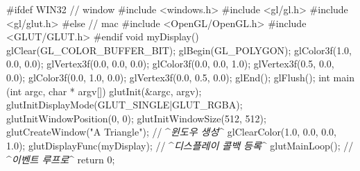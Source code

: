 #ifdef WIN32 // window 
#include <windows.h>
#include <gl/gl.h>
#include <gl/glut.h>
#else // mac
#include <OpenGL/OpenGL.h>
#include <GLUT/GLUT.h>
#endif
void myDisplay() {
    glClear(GL_COLOR_BUFFER_BIT);
    glBegin(GL_POLYGON);
    glColor3f(1.0, 0.0, 0.0);
    glVertex3f(0.0, 0.0, 0.0);
    glColor3f(0.0, 0.0, 1.0);
    glVertex3f(0.5, 0.0, 0.0);
    glColor3f(0.0, 1.0, 0.0);
    glVertex3f(0.0, 0.5, 0.0);
    glEnd();
    glFlush();    
}
int main (int argc, char * argv[]) {
    glutInit(&argc, argv);
    glutInitDisplayMode(GLUT_SINGLE|GLUT_RGBA);
    glutInitWindowPosition(0, 0);
    glutInitWindowSize(512, 512);
    glutCreateWindow("A Triangle");  // ^{\it 윈도우 생성}^
    glClearColor(1.0, 0.0, 0.0, 1.0);
    glutDisplayFunc(myDisplay);	// ^{\it 디스플레이 콜백 등록}^
    glutMainLoop();				// ^{\it 이벤트 루프로}^
    return 0;
}